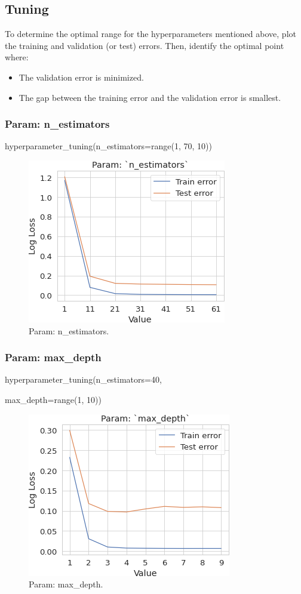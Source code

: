 \documentclass[conference]{IEEEtran}
\begin{document}
\subsection{Tuning}
To determine the optimal range for the hyperparameters mentioned above, plot the training and validation (or test) errors. Then, identify the optimal point where:

\begin{itemize}
    \item The validation error is minimized.
    \item The gap between the training error and the validation error is smallest.
\end{itemize}

\subsubsection{Param: n\_estimators}
hyperparameter\_tuning(n\_estimators=range(1,  70,  10))

\begin{figure}[H]
    \centerline{\includegraphics[width=0.7\linewidth]{fig10}}
    \caption{Param: n\_estimators.}
    \label{fig10}
\end{figure}

\subsubsection{Param: max\_depth}
hyperparameter\_tuning(n\_estimators=40,

max\_depth=range(1,  10))

\begin{figure}[H]
    \centerline{\includegraphics[width=0.7\linewidth]{fig11}}
    \caption{Param: max\_depth.}
    \label{fig11}
\end{figure}
\end{document}
